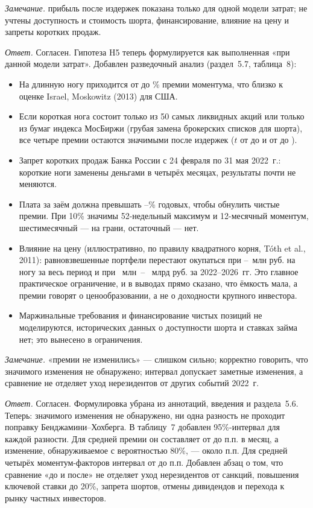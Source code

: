 \documentclass[11pt]{article}
\newcommand{\point}[1]{\par\vspace{10pt}{\large #1}\par\vspace{2pt}}
\newcommand{\remark}[1]{\textit{Замечание.} #1\par}
\newcommand{\answer}{\textit{Ответ.} }
\begin{document}
\point{3. Издержки и реализуемость}
\remark{прибыль после издержек показана только для одной модели затрат; не учтены доступность и стоимость шорта,
финансирование, влияние на цену и запреты коротких продаж.}
\answer Согласен. Гипотеза H5 теперь формулируется как выполненная «при данной модели затрат». Добавлен
разведочный анализ (раздел~5.7, таблица~8):
\begin{itemize}
\item На длинную ногу приходится от  до \% премии моментума, что близко к
оценке Israel, Moskowitz (2013) для США.
\item Если короткая нога состоит только из 50 самых ликвидных акций или только из бумаг индекса МосБиржи (грубая
замена брокерских списков для шорта), все четыре премии остаются значимыми после издержек ($t$ от
 до  и от  до ).
\item Запрет коротких продаж Банка России с 24 февраля по 31 мая 2022~г.: короткие ноги заменены деньгами в четырёх
месяцах, результаты почти не меняются.
\item Плата за заём должна превышать --\% годовых, чтобы обнулить чистые премии. При
10\% значимы 52-недельный максимум и 12-месячный моментум, шестимесячный --- на грани, остаточный --- нет.
\item Влияние на цену (иллюстративно, по правилу квадратного корня, Tóth et al., 2011): равновзвешенные портфели
перестают окупаться при --~млн руб. на ногу за весь период и при
~млн~-- ~млрд руб. за 2022--2026~гг. Это главное практическое ограничение, и в
выводах прямо сказано, что ёмкость мала, а премии говорят о ценообразовании, а не о доходности крупного инвестора.
\item Маржинальные требования и финансирование чистых позиций не моделируются, исторических данных о доступности
шорта и ставках займа нет; это вынесено в ограничения.
\end{itemize}

\point{4. Премии после 2022 года}
\remark{«премии не изменились» --- слишком сильно; корректно говорить, что значимого изменения не обнаружено;
интервал допускает заметные изменения, а сравнение не отделяет уход нерезидентов от других событий 2022~г.}
\answer Согласен. Формулировка убрана из аннотаций, введения и раздела~5.6. Теперь: значимого изменения не
обнаружено, ни одна разность не проходит поправку Бенджамини--Хохберга. В таблицу~7 добавлен 95\%-интервал для
каждой разности. Для средней премии он составляет от  до  п.п. в месяц, а изменение,
обнаруживаемое с вероятностью 80\%, --- около  п.п. Для средней четырёх моментум-факторов интервал
от  до  п.п. Добавлен абзац о том, что сравнение «до и после» не отделяет уход
нерезидентов от санкций, повышения ключевой ставки до 20\%, запрета шортов, отмены дивидендов и перехода к рынку
частных инвесторов.
\end{document}
